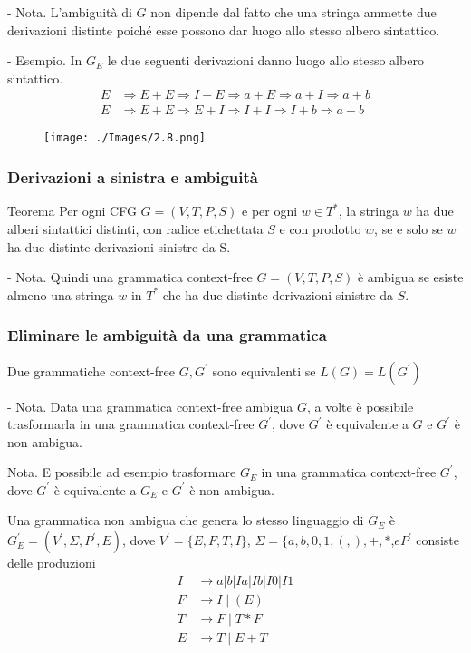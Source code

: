 - Nota. L'ambiguità di $G$ non dipende dal fatto che una stringa ammette due derivazioni distinte poiché esse possono dar luogo allo stesso albero sintattico.

- Esempio. In $G_{E}$ le due seguenti derivazioni danno luogo allo stesso albero sintattico.
$$
\begin{aligned}
E & \Rightarrow E+E \Rightarrow I+E \Rightarrow a+E \Rightarrow a+I \Rightarrow a+b \\
E & \Rightarrow E+E \Rightarrow E+I \Rightarrow I+I \Rightarrow I+b \Rightarrow a+b
\end{aligned}
$$

\begin{figure}[hbpt!]
    \centering
    \texttt{[image: ./Images/2.8.png]}
\end{figure}
\FloatBarrier

\subsubsection{Derivazioni a sinistra e ambiguità}

Teorema
Per ogni CFG $ G=(V, T, P, S)$ e per ogni $w \in T^{*}$, la stringa $w$ ha due alberi sintattici distinti, con radice etichettata $S$ e con prodotto $w$, se e solo se $w$ ha due distinte derivazioni sinistre da S.


- Nota. Quindi una grammatica context-free $G=(V, T, P, S)$ è ambigua se esiste almeno una stringa $w$ in $T^{*}$ che ha due distinte derivazioni sinistre da $S$.

\subsubsection{Eliminare le ambiguità da una grammatica}

Due grammatiche context-free $G, G^{\prime}$ sono equivalenti se $L(G)=L\left(G^{\prime}\right)$

- Nota. Data una grammatica context-free ambigua $G$, a volte è possibile trasformarla in una grammatica context-free $G^{\prime}$, dove $G^{\prime}$ è equivalente a $G$ e $G^{\prime}$ è non ambigua.

Nota. E possibile ad esempio trasformare $G_{E}$ in una grammatica context-free $G^{\prime}$, dove $G^{\prime}$ è equivalente a $G_{E}$ e $G^{\prime}$ è non ambigua.

Una grammatica non ambigua che genera lo stesso linguaggio di $G_{E}$ è $G_{E}^{\prime}=\left(V^{\prime}, \Sigma, P^{\prime}, E\right)$, dove $V^{\prime}=\{E, F, T, I\}$, $\Sigma=\{a, b, 0,1,(,),+, *$,$ e P^{\prime}$ consiste delle produzioni
$$
\begin{aligned}
I & \rightarrow a|b| Ia|Ib|I0|I1 \\
F & \rightarrow I \mid(E) \\
T & \rightarrow F \mid T * F \\
E & \rightarrow T \mid E+T
\end{aligned}
$$

